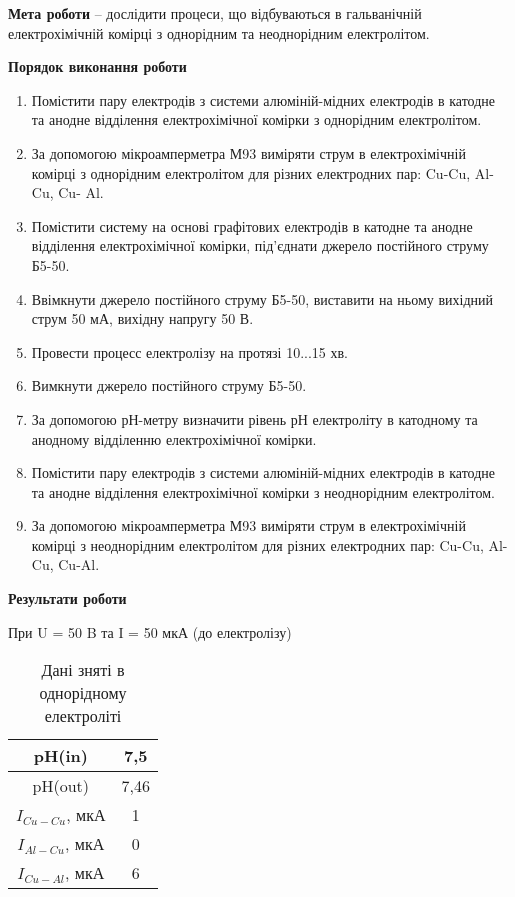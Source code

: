 \documentclass[a4paper,14pt]{extreport}
\begin{document}
\newpage
\setcounter{page}{2}
\textbf{Мета роботи} – дослідити процеси, що відбуваються в гальванічній
електрохімічній комірці з однорідним та неоднорідним електролітом.


\begin{center}
\textbf{Порядок виконання роботи}
\end{center}
\begin{enumerate}
  \item Помістити пару електродів з системи алюміній-мідних електродів в
  катодне та анодне відділення електрохімічної комірки з однорідним електролітом.
  \item За допомогою мікроамперметра М93 виміряти струм в електрохімічній
  комірці з однорідним електролітом для різних електродних пар: Cu-Cu, Al-Cu, Cu-
  Al.
  \item Помістити систему на основі графітових електродів в катодне та анодне
  відділення електрохімічної комірки, під'єднати джерело постійного струму Б5-50.
  \item Ввімкнути джерело постійного струму Б5-50, виставити на ньому
  вихідний струм 50 мА, вихідну напругу 50 В.
  \item Провести процесс електролізу на протязі 10...15 хв.
  \item Вимкнути джерело постійного струму Б5-50.
  \item За допомогою рН-метру визначити рівень рН електроліту в катодному та
  анодному відділенню електрохімічної комірки.
  \item Помістити пару електродів з системи алюміній-мідних електродів в
  катодне та анодне відділення електрохімічної комірки з неоднорідним
  електролітом.
  \item За допомогою мікроамперметра М93 виміряти струм в електрохімічній
  комірці з неоднорідним електролітом для різних електродних пар: Cu-Cu, Al-Cu,
  Cu-Al.
\end{enumerate}

\clearpage
\newpage

\begin{center}
\textbf{Результати роботи}
\end{center}


\begin{tcolorbox}[colback=green!30,colframe=black,width=12cm,arc=3mm]
  При U = 50 B та I = 50 мкА (до електролізу)
\end{tcolorbox}
\begin{table}[h]
  \begin{center}
    \begin{tabular}{|c|c|}
      \hline
      pH(in)            & 7,5  \\ \hline
      pH(out)          & 7,46 \\ \hline
      $I_{Cu-Cu}$, мкА & 1    \\ \hline
      $I_{Al-Cu}$, мкА & 0    \\ \hline
      $I_{Cu-Al}$, мкА & 6    \\ \hline
    \end{tabular}
    \caption{Дані зняті в однорідному електроліті}
    \label{tab1}
  \end{center}
\end{table}
\end{document}
